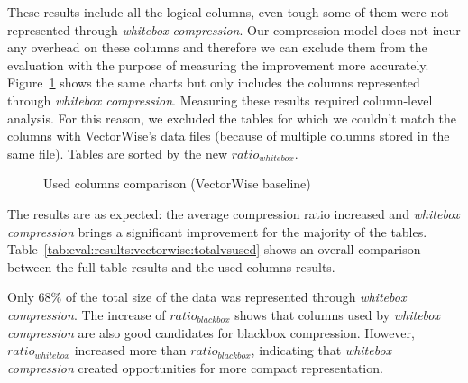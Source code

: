 These results include all the logical columns, even tough some of them were not represented through \textit{whitebox compression}. Our compression model does not incur any overhead on these columns and therefore we can exclude them from the evaluation with the purpose of measuring the improvement more accurately. Figure~\ref{fig:eval:results:vectorwise:used} shows the same charts but only includes the columns represented through \textit{whitebox compression}. Measuring these results required column-level analysis. For this reason, we excluded the tables for which we couldn't match the columns with VectorWise's data files (because of multiple columns stored in the same file). Tables are sorted by the new \(ratio_{whitebox}\).

\begin{figure}[h]
  \centering
  \caption{Used columns comparison (VectorWise baseline)}
  \label{fig:eval:results:vectorwise:used}
\end{figure}

The results are as expected: the average compression ratio increased and \textit{whitebox compression} brings a significant improvement for the majority of the tables. Table~\ref{tab:eval:results:vectorwise:totalvsused} shows an overall comparison between the full table results and the used columns results.



Only 68\% of the total size of the data was represented through \textit{whitebox compression}. The increase of \(ratio_{blackbox}\) shows that columns used by \textit{whitebox compression} are also good candidates for  blackbox compression. However, \(ratio_{whitebox}\) increased more than \(ratio_{blackbox}\), indicating that \textit{whitebox compression} created opportunities for more compact representation.

